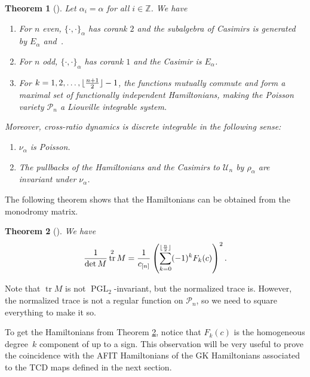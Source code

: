 \documentclass[10pt,a4paper]{amsart}
\numberwithin{equation}{section}
\newtheorem{Theorem}{Theorem}[section]
\DeclarePairedDelimiter\floor{\lfloor}{\rfloor}
\newcommand{\Z}{{\mathbb Z}}
\newcommand{\PGL}{\operatorname{PGL}}
\newcommand{\la}{\label}
\DeclareMathOperator{\tr}{tr}
\begin{document}
\begin{Theorem}[] %
		Let $\alpha_i=\alpha$ for all $i \in \Z$. We have
		\begin{enumerate}\itemsep=0pt
			\item[$1.$] For $n$ even, $\{\cdot,\cdot \}_{ \alpha}$ has corank $2$ and the subalgebra of Casimirs is generated by $E_{\alpha}$ and~.
			\item[$2.$] For $n$ odd, $\{\cdot,\cdot \}_{ \alpha}$ has corank $1$ and the Casimir is $E_{\alpha}$.
			\item[$3.$] For $k=1,2,\dots, \floor{\frac{n+1}{2}} -1$, the functions  mutually commute and form a maximal set of functionally independent Hamiltonians, making the Poisson variety $\mathcal P_n$ a Liouville integrable system.
		\end{enumerate}
		Moreover, cross-ratio dynamics is discrete integrable in the following sense:
		\begin{enumerate}\itemsep=0pt
			\item[$4.$] $\nu_{\alpha}$ is Poisson.
			\item[$5.$] The pullbacks of the Hamiltonians and the Casimirs to $\mathcal U_n$ by $\rho_{\alpha}$ are invariant under $\nu_{\alpha}$.
		\end{enumerate}
	\end{Theorem}
	
	The following theorem shows that the Hamiltonians can be obtained from the monodromy matrix.
	\begin{Theorem}[] \la{thm:afit2}
		We have
		\[
		\frac{1}{\det M}\tr^2 M= \frac{1}{c_{[n]}}\left(\sum_{k=0}^{\floor{\frac n 2}} (-1)^k F_k(c)\right)^2.
		\]
	\end{Theorem}
	
	\begin{Remark}
		Note that $\tr M$ is not $\PGL_2$-invariant, but the normalized trace \smash{$\frac{\tr M}{{\sqrt{\det M}}}$} is. However, the normalized trace is not a regular function on $\mathcal P_n$, so we need to square everything to make it so.
	\end{Remark}
	
To get the Hamiltonians from Theorem \ref{thm:afit2}, notice that $F_k(c)$ is the homogeneous degree~$k$ component of \smash{\raisebox{1pt}{$\sqrt{c_{[n]}} \frac{\tr M}{\sqrt{\det M}}$}} up to a sign. This observation will be very useful to prove the coincidence with the AFIT Hamiltonians of the GK Hamiltonians associated to the TCD maps defined in the next section.
\end{document}
